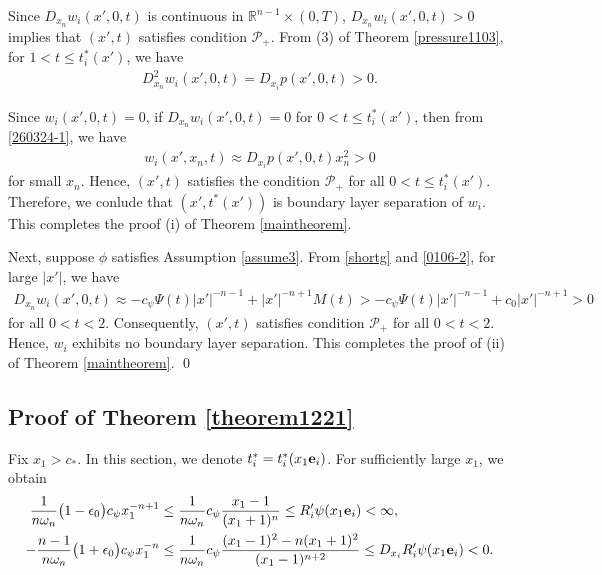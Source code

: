 \documentclass{amsart}
\numberwithin{equation}{section}
\newcommand{\ep}{{ \epsilon  }}
\newcommand{\om}{{ \omega  }}
\newcommand{\Rn}{{\mathbb R}^{n-1}}
\begin{document}
Since $D_{x_n} w_i (x', 0,t)$ is continuous in $\Rn \times (0, T)$, $D_{x_n} w_i (x', 0, t) > 0$ implies that 
$(x', t)$ satisfies condition ${\mathcal P}_+$. From (3) of  Theorem \ref{pressure1103},  for $ 1 < t\leq t_i^*(x')$, we have 
\begin{align}\label{260324-1}
D^2_{x_n}w_i (x', 0, t) = D_{x_i} p(x', 0,t ) > 0.
\end{align}



Since $w_i (x', 0, t ) = 0$, if  $D_{x_n} w_i (x', 0, t ) = 0$ for $ 0 < t \leq t_i^*(x')$, then from \eqref{260324-1},  we have 
\begin{align*}%
w_i(x', x_n, t) \approx D_{x_i} p(x', 0,t) x_n^2 > 0
\end{align*}
for  small $x_n$. Hence,  $(x', t)$ satisfies the condition $ {\mathcal P}_+$ for all $ 0< t\leq t_i^*(x')$.  Therefore, we conlude that $(x',t^*(x') )$ is boundary layer separation of $w_i$. This completes the proof  (i) of Theorem \ref{maintheorem}.

Next, suppose  $\phi$ satisfies Assumption \ref{assume3}.  From \eqref{shortg} and \eqref{0106-2},  for large $|x'|$, we have 
\begin{align}\label{060410-5}
D_{x_n} w_i (x', 0,t)  \approx  -c_\psi   \Psi(t) |x'|^{-n-1}   + |x'|^{-n +1} M(t) > -c_\psi   \Psi(t) |x'|^{-n-1}   + c_0 |x'|^{-n +1} > 0
\end{align}
for all $0 < t < 2$.  Consequently, $(x', t)$ satisfies condition ${\mathcal P}_+$ for all $0 < t < 2$. Hence, $w_i$ exhibits no 
boundary layer separation. This completes the proof of (ii) of Theorem \ref{maintheorem}.
\qed


 


 
\subsection{Proof of Theorem \ref{theorem1221} }
\label{mainsection2}



Fix $x_1 > c_*$. In this section, we denote $t^*_i = t_i^* (x_1 {\bf e}_i)$.   For sufficiently large $x_1$, we obtain 
\begin{align}\label{260111-2}
\begin{split}
  \frac1{n\om_n }  \big(1 -\ep_0\big)  c_\psi   x_1^{-n +1}  & \leq \frac1{n\om_n }   c_\psi  \frac{x_1 -1}{(x_1 +1)^n}  \leq  R'_i \psi(x_1 {\bf e}_i)  < \infty,\\
-  \frac{n-1}{n\om_n }  \big( 1  +\ep_0   \big) c_\psi   x_1^{-n} &  \leq  \frac{1}{n\om_n }  c_\psi   \frac{(x_1 -1)^2 -n(x_1 + 1)^2}{(x_1 -1)^{n+2}}  \leq  D_{x_i} R'_i \psi (x_1 {\bf e}_i) <0.
\end{split}
\end{align}
\end{document}
